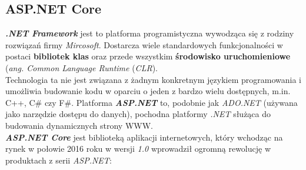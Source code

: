 \subsection{ASP.NET Core}
\textbf{\textit{.NET Framework}} jest to platforma programistyczna wywodząca się z rodziny rozwiązań firmy \textit{Mircosoft}.  Dostarcza wiele standardowych funkcjonalności w postaci \textbf{bibliotek klas} oraz przede wszystkim \textbf{środowisko uruchomieniowe} (\textit{ang. Common Language Runtime} (\textit{CLR}). \\
Technologia ta nie jest związana z żadnym konkretnym językiem programowania i umożliwia budowanie kodu w oparciu o jeden z bardzo wielu dostępnych, m.in. C++, C\# czy F\#. Platforma \textit{\textbf{ASP.NET}} to, podobnie jak \textit{ADO.NET} (używana jako narzędzie dostępu do danych), pochodna platformy \textit{.NET} służąca do budowania dynamicznych strony WWW. \\
    \textbf{\textit{ASP.NET Core}} jest biblioteką aplikacji internetowych, który wchodząc na rynek w połowie 2016 roku w wersji \textit{1.0} wprowadził ogromną rewolucję w produktach z serii \textit{ASP.NET}: 
